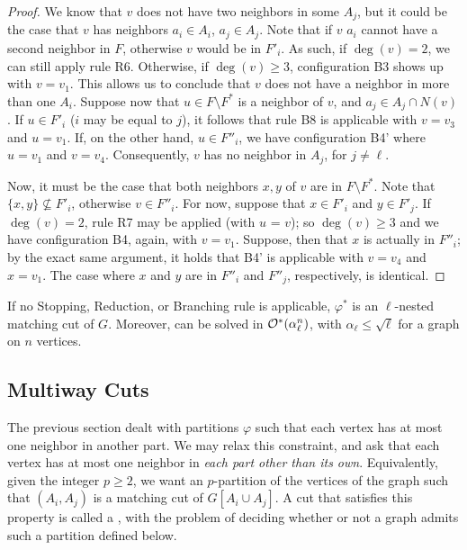 \begin{proof}
	We know that $v$ does not have two neighbors in some $A_j$, but it could be the case that $v$ has neighbors $a_i \in A_i$, $a_j \in A_j$.
	Note that if $v$ $a_i$ cannot have a second  neighbor in $F$, otherwise $v$ would be in $F'_i$.
	As such, if $\deg(v) = 2$, we can still apply rule R6.
	Otherwise, if $\deg(v) \geq 3$, configuration B3 shows up with $v = v_1$.
	This allows us to conclude that $v$ does not have a neighbor in more than one $A_i$.
	Suppose now that $u \in F \setminus F^*$ is a neighbor of $v$, and $a_j \in A_j \cap N(v)$.
	If $u \in F'_i$ ($i$ may be equal to $j$), it follows that rule B8 is applicable with $v = v_3$ and $u = v_1$.
	If, on the other hand, $u \in F''_i$, we have configuration B4' where $u = v_1$ and $v = v_4$.
	Consequently, $v$ has no neighbor in $A_j$, for $j \neq \ell$.
	
	Now, it must be the case that both neighbors $x,y$ of $v$ are in $F \setminus F^*$.
	Note that $\{x,y\} \nsubseteq F'_i$, otherwise $v \in F''_i$.
	For now, suppose that $x \in F'_i$ and $y \in F'_j$.
	If $\deg(v) = 2$, rule R7 may be applied (with $u$ = $v$); so $\deg(v) \geq 3$ and we have configuration B4, again, with $v = v_1$.
	Suppose, then that $x$ is actually in $F''_i$; by the exact same argument, it holds that B4' is applicable with $v = v_4$ and $x = v_1$.
	The case where $x$ and $y$ are in $F''_i$ and $F''_j$, respectively, is identical.
\end{proof}

\begin{theorem}
	If no Stopping, Reduction, or Branching rule is applicable, $\varphi^*$ is an $\ell$-nested matching cut of $G$.
	Moreover,  can be solved in $\mathcal{O}^*\!\left(\alpha_\ell^n\right)$, with $\alpha_\ell \leq \sqrt{\ell}$ for a graph on $n$ vertices.
\end{theorem}



\subsection{Multiway Cuts}

The previous section dealt with partitions $\varphi$ such that each vertex has at most one neighbor in another part.
We may relax this constraint, and ask that each vertex has at most one neighbor in \textit{each part other than its own}.
Equivalently, given the integer $p \geq 2$, we want an $p$-partition of the vertices of the graph such that $(A_i, A_j)$ is a matching cut of $G[A_i \cup A_j]$.
A cut that satisfies this property is called a , with the problem of deciding whether or not a graph admits such a partition defined below.

